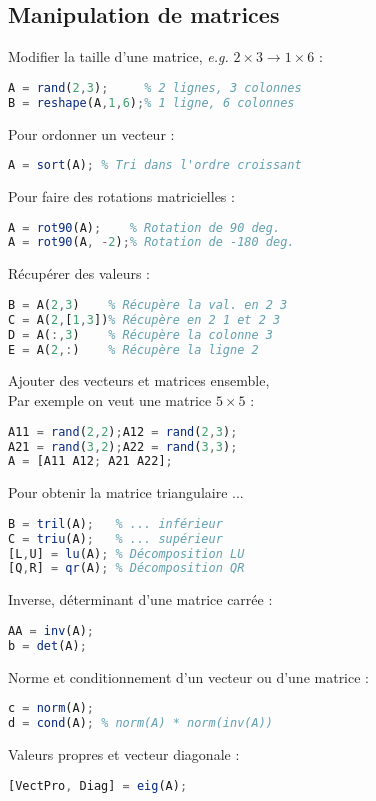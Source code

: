         \subsection{Manipulation de matrices}
            Modifier la taille d'une matrice, \textit{e.g.} $2\times 3 \rightarrow 1\times 6$ :
            \begin{lstlisting}[language=Octave]
A = rand(2,3);     % 2 lignes, 3 colonnes
B = reshape(A,1,6);% 1 ligne, 6 colonnes
            \end{lstlisting}
            Pour ordonner un vecteur :
            \begin{lstlisting}[language=Octave]
A = sort(A); % Tri dans l'ordre croissant
            \end{lstlisting}
            Pour faire des rotations matricielles :
            \begin{lstlisting}[language=Octave]
A = rot90(A);    % Rotation de 90 deg.
A = rot90(A, -2);% Rotation de -180 deg.
            \end{lstlisting}
            Récupérer des valeurs :
            \begin{lstlisting}[language=Octave]
B = A(2,3)    % Récupère la val. en 2 3
C = A(2,[1,3])% Récupère en 2 1 et 2 3
D = A(:,3)    % Récupère la colonne 3
E = A(2,:)    % Récupère la ligne 2
            \end{lstlisting}
            Ajouter des vecteurs et matrices ensemble,\\Par exemple on veut une matrice $5\times 5$ :
            \begin{lstlisting}[language=Octave]
A11 = rand(2,2);A12 = rand(2,3);
A21 = rand(3,2);A22 = rand(3,3);
A = [A11 A12; A21 A22];
            \end{lstlisting}
            Pour obtenir la matrice triangulaire ...
            \begin{lstlisting}[language=Octave]
B = tril(A);   % ... inférieur
C = triu(A);   % ... supérieur
[L,U] = lu(A); % Décomposition LU
[Q,R] = qr(A); % Décomposition QR
            \end{lstlisting}

            Inverse, déterminant d'une matrice carrée :
            \begin{lstlisting}[language=Octave]
AA = inv(A);
b = det(A);
            \end{lstlisting}
            Norme et conditionnement d'un vecteur ou d'une matrice :
            \begin{lstlisting}[language=Octave]
c = norm(A); 
d = cond(A); % norm(A) * norm(inv(A))
            \end{lstlisting}
            Valeurs propres et vecteur diagonale :
            \begin{lstlisting}[language=Octave]
[VectPro, Diag] = eig(A);
            \end{lstlisting}
